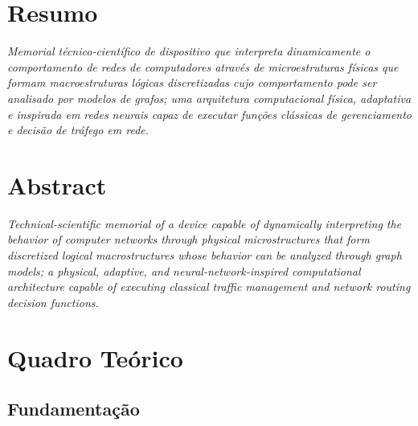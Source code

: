 \documentclass[12pt,a4paper]{article}
\begin{document}
\begin{tcolorbox}[
    colback=white,
    colframe=black,
    width=\textwidth,
    arc=2mm,
    boxrule=0.5pt
]

{\small
{}

\section*{\centering Resumo}

\noindent
\textit{
Memorial técnico-científico de dispositivo que interpreta dinamicamente o comportamento de redes de computadores através de microestruturas físicas que formam macroestruturas lógicas discretizadas cujo comportamento pode ser analisado por modelos de grafos; uma arquitetura computacional física, adaptativa e inspirada em redes neurais capaz de executar funções clássicas de gerenciamento e decisão de tráfego em rede.
}

\vspace{0.7cm}

\section*{\centering Abstract}

\noindent
\textit{
Technical-scientific memorial of a device capable of dynamically interpreting the behavior of computer networks through physical microstructures that form discretized logical macrostructures whose behavior can be analyzed through graph models; a physical, adaptive, and neural-network-inspired computational architecture capable of executing classical traffic management and network routing decision functions.
}

}

\end{tcolorbox}

\vspace{1cm}
\newpage

\section{Quadro Teórico}

\subsection{Fundamentação}
\end{document}
